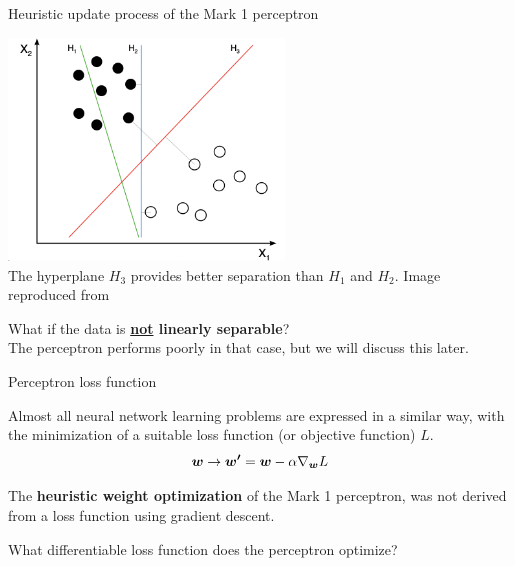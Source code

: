 \begin{frame}[t]{Heuristic update process of the Mark 1 perceptron}
    
    \begin{center}
        \includegraphics[width=0.55\textwidth]{./images/perceptron/data_linearly_separable.png}\\
        {\scriptsize 
        The hyperplane $H_3$ provides better separation than $H_1$ and $H_2$.
        \color{col:attribution} 
        Image reproduced from \cite{Wikipedia:LinearSeparability}}\\
    \end{center}
    \vspace{0.2cm}
    What if the data is {\bf \underline{not} linearly separable}?\\
    The \gls{perceptron} performs poorly in that case, but we will discuss this later.\\

\end{frame}

%
%
%

\begin{frame}[t]{Perceptron loss function}

    Almost all neural network learning problems are expressed in a similar way, 
    with the minimization of a suitable 
    \gls{loss function} (or 
    \gls{objective function}) $L$.\\
    \begin{equation}
        \boldsymbol{w} \rightarrow \boldsymbol{w^\prime} = \boldsymbol{w} - \alpha \nabla_{\boldsymbol{w}} L
    \end{equation}
    \vspace{0.4cm}

    The {\bf heuristic weight optimization} 
    of the Mark 1 \gls{perceptron},
    was not derived from a \gls{loss function} 
    using \gls{gradient descent}.\\
    \vspace{0.4cm}
    
    What differentiable \gls{loss function} 
    does the \gls{perceptron} optimize?\\

\end{frame}



